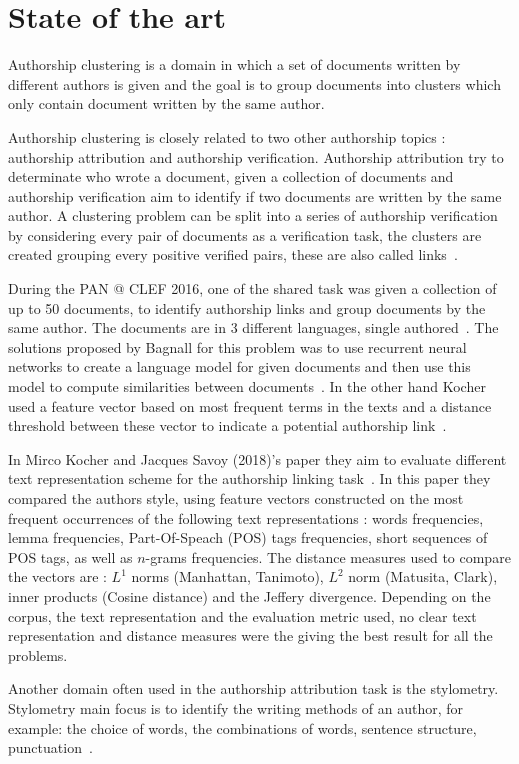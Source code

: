 \section{State of the art \label{sec:state_of_the_art}}

Authorship clustering is a domain in which a set of documents written by different authors is given and the goal is to group documents into clusters which only contain document written by the same author.

Authorship clustering is closely related to two other authorship topics : authorship attribution and authorship verification.
Authorship attribution try to determinate who wrote a document, given a collection of documents and authorship verification aim to identify if two documents are written by the same author.
A clustering problem can be split into a series of authorship verification by considering every pair of documents as a verification task, the clusters are created grouping every positive verified pairs, these are also called links~\cite{pan16_clustering_site}.

During the PAN @ CLEF 2016, one of the shared task was given a collection of up to 50 documents, to identify authorship links and group documents by the same author.
The documents are in 3 different languages, single authored~\cite{pan16}.
The solutions proposed by Bagnall for this problem was to use recurrent neural networks to create a language model for given documents and then use this model to compute similarities between documents~\cite{bagnall_pan16}.
In the other hand Kocher used a feature vector based on most frequent terms in the texts and a distance threshold between these vector to indicate a potential authorship link~\cite{kocher_pan16}.

In Mirco Kocher and Jacques Savoy (2018)'s paper they aim to evaluate different text representation scheme for the authorship linking task~\cite{kocher_verification}.
In this paper they compared the authors style, using feature vectors constructed on the most frequent occurrences of the following text representations : words frequencies, lemma frequencies, Part-Of-Speach (POS) tags frequencies, short sequences of POS tags, as well as $n$-grams frequencies.
The distance measures used to compare the vectors are : $L^1$ norms (Manhattan, Tanimoto), $L^2$ norm (Matusita, Clark), inner products (Cosine distance) and the Jeffery divergence.
Depending on the corpus, the text representation and the evaluation metric used, no clear text representation and distance measures were the giving the best result for all the problems.

Another domain often used in the authorship attribution task is the stylometry.
Stylometry main focus is to identify the writing methods of an author, for example: the choice of words, the combinations of words, sentence structure, punctuation~\cite{savoy_stylo}.
